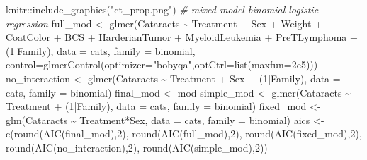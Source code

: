 \documentclass[12pt]{article}
\newenvironment{Shaded}{\begin{snugshade}}{\end{snugshade}}
\newcommand{\AttributeTok}[1]{\textcolor[rgb]{0.77,0.63,0.00}{#1}}
\newcommand{\CommentTok}[1]{\textcolor[rgb]{0.56,0.35,0.01}{\textit{#1}}}
\newcommand{\DecValTok}[1]{\textcolor[rgb]{0.00,0.00,0.81}{#1}}
\newcommand{\FloatTok}[1]{\textcolor[rgb]{0.00,0.00,0.81}{#1}}
\newcommand{\FunctionTok}[1]{\textcolor[rgb]{0.00,0.00,0.00}{#1}}
\newcommand{\NormalTok}[1]{#1}
\newcommand{\OtherTok}[1]{\textcolor[rgb]{0.56,0.35,0.01}{#1}}
\newcommand{\SpecialCharTok}[1]{\textcolor[rgb]{0.00,0.00,0.00}{#1}}
\newcommand{\StringTok}[1]{\textcolor[rgb]{0.31,0.60,0.02}{#1}}
\begin{document}
\begin{Shaded}
\begin{Highlighting}[]
\NormalTok{knitr}\SpecialCharTok{::}\FunctionTok{include\_graphics}\NormalTok{(}\StringTok{"ct\_prop.png"}\NormalTok{)}
\CommentTok{\# mixed model binomial logistic regression }
\NormalTok{full\_mod }\OtherTok{\textless{}{-}} \FunctionTok{glmer}\NormalTok{(Cataracts }\SpecialCharTok{\textasciitilde{}}\NormalTok{ Treatment }\SpecialCharTok{+}\NormalTok{ Sex }\SpecialCharTok{+}\NormalTok{ Weight }\SpecialCharTok{+}\NormalTok{ CoatColor }\SpecialCharTok{+}\NormalTok{ BCS }\SpecialCharTok{+}\NormalTok{ HarderianTumor }\SpecialCharTok{+}
\NormalTok{                    MyeloidLeukemia }\SpecialCharTok{+}\NormalTok{ PreTLymphoma }\SpecialCharTok{+}\NormalTok{ (}\DecValTok{1}\SpecialCharTok{|}\NormalTok{Family), }\AttributeTok{data =}\NormalTok{ cats, }\AttributeTok{family =}\NormalTok{ binomial,}
                  \AttributeTok{control=}\FunctionTok{glmerControl}\NormalTok{(}\AttributeTok{optimizer=}\StringTok{"bobyqa"}\NormalTok{,}\AttributeTok{optCtrl=}\FunctionTok{list}\NormalTok{(}\AttributeTok{maxfun=}\FloatTok{2e5}\NormalTok{)))}
\NormalTok{no\_interaction }\OtherTok{\textless{}{-}} \FunctionTok{glmer}\NormalTok{(Cataracts }\SpecialCharTok{\textasciitilde{}}\NormalTok{ Treatment }\SpecialCharTok{+}\NormalTok{ Sex }\SpecialCharTok{+}\NormalTok{ (}\DecValTok{1}\SpecialCharTok{|}\NormalTok{Family), }\AttributeTok{data =}\NormalTok{ cats, }\AttributeTok{family =}\NormalTok{ binomial)}
\NormalTok{final\_mod }\OtherTok{\textless{}{-}}\NormalTok{ mod}
\NormalTok{simple\_mod }\OtherTok{\textless{}{-}} \FunctionTok{glmer}\NormalTok{(Cataracts }\SpecialCharTok{\textasciitilde{}}\NormalTok{ Treatment }\SpecialCharTok{+}\NormalTok{ (}\DecValTok{1}\SpecialCharTok{|}\NormalTok{Family), }\AttributeTok{data =}\NormalTok{ cats, }\AttributeTok{family =}\NormalTok{ binomial)}
\NormalTok{fixed\_mod }\OtherTok{\textless{}{-}} \FunctionTok{glm}\NormalTok{(Cataracts }\SpecialCharTok{\textasciitilde{}}\NormalTok{ Treatment}\SpecialCharTok{*}\NormalTok{Sex, }\AttributeTok{data =}\NormalTok{ cats, }\AttributeTok{family =}\NormalTok{ binomial)}
\NormalTok{aics }\OtherTok{\textless{}{-}} \FunctionTok{c}\NormalTok{(}\FunctionTok{round}\NormalTok{(}\FunctionTok{AIC}\NormalTok{(final\_mod),}\DecValTok{2}\NormalTok{), }\FunctionTok{round}\NormalTok{(}\FunctionTok{AIC}\NormalTok{(full\_mod),}\DecValTok{2}\NormalTok{), }\FunctionTok{round}\NormalTok{(}\FunctionTok{AIC}\NormalTok{(fixed\_mod),}\DecValTok{2}\NormalTok{), }\FunctionTok{round}\NormalTok{(}\FunctionTok{AIC}\NormalTok{(no\_interaction),}\DecValTok{2}\NormalTok{), }\FunctionTok{round}\NormalTok{(}\FunctionTok{AIC}\NormalTok{(simple\_mod),}\DecValTok{2}\NormalTok{))}

\end{Highlighting}
\end{Shaded}
\end{document}
